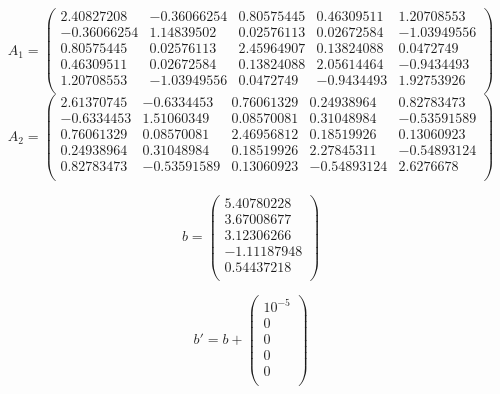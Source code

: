 \documentclass[11pt]{extarticle}
\begin{document}
	\begin{equation}
		A_1 = \begin{pmatrix}
			2.40827208 & -0.36066254 & 0.80575445 & 0.46309511 & 1.20708553 \\
			-0.36066254 & 1.14839502 & 0.02576113 & 0.02672584 & -1.03949556 \\
			0.80575445 & 0.02576113 & 2.45964907 & 0.13824088 & 0.0472749 \\
			0.46309511 & 0.02672584 & 0.13824088 & 2.05614464 & -0.9434493 \\
			1.20708553 & -1.03949556 & 0.0472749 & -0.9434493 & 1.92753926 \\
		\end{pmatrix}
	\end{equation}
	\begin{equation}
		A_2 = \begin{pmatrix}
			2.61370745 & -0.6334453 & 0.76061329 & 0.24938964 & 0.82783473 \\
			-0.6334453 & 1.51060349 & 0.08570081 & 0.31048984 & -0.53591589 \\
			0.76061329 & 0.08570081 & 2.46956812 & 0.18519926 & 0.13060923 \\
			0.24938964 & 0.31048984 & 0.18519926 & 2.27845311 & -0.54893124 \\
			0.82783473 & -0.53591589 & 0.13060923 & -0.54893124 & 2.6276678 \\
		\end{pmatrix}
	\end{equation}

	\begin{multicols}{2}
		\begin{equation}
			b = \begin{pmatrix}
				5.40780228 \\
				3.67008677 \\
				3.12306266 \\
				-1.11187948 \\
				0.54437218 \\
			\end{pmatrix}
		\end{equation}

		\begin{equation}
			b' = b + \begin{pmatrix}
				10^{-5} \\
				0 \\
				0 \\
				0 \\
				0 \\
			\end{pmatrix}
		\end{equation}
	\end{multicols}
\end{document}
